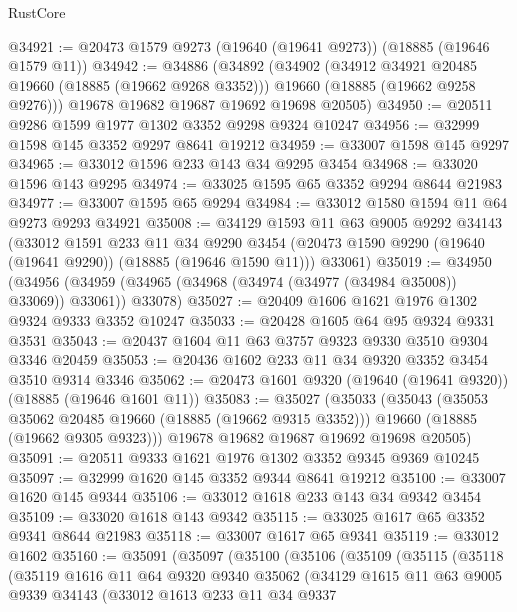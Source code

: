 \begin{lexlean}{RustCore}
\begin{coremodule}
@34921 := @20473 @1579 @9273 (@19640 (@19641 @9273)) (@18885 (@19646 @1579 @11))
@34942 := @34886
    (@34892
      (@34902
        (@34912 @34921 @20485 @19660 (@18885 (@19662 @9268 @3352)))
        @19660
        (@18885 (@19662 @9258 @9276)))
      @19678
      @19682
      @19687
      @19692
      @19698
      @20505)
@34950 := @20511 @9286 @1599 @1977 @1302 @3352 @9298 @9324 @10247
@34956 := @32999 @1598 @145 @3352 @9297 @8641 @19212
@34959 := @33007 @1598 @145 @9297
@34965 := @33012 @1596 @233 @143 @34 @9295 @3454
@34968 := @33020 @1596 @143 @9295
@34974 := @33025 @1595 @65 @3352 @9294 @8644 @21983
@34977 := @33007 @1595 @65 @9294
@34984 := @33012 @1580 @1594 @11 @64 @9273 @9293 @34921
@35008 := @34129
    @1593
    @11
    @63
    @9005
    @9292
    @34143
    (@33012
      @1591
      @233
      @11
      @34
      @9290
      @3454
      (@20473 @1590 @9290 (@19640 (@19641 @9290)) (@18885 (@19646 @1590 @11)))
      @33061)
@35019 := @34950
    (@34956 (@34959 (@34965 (@34968 (@34974 (@34977 (@34984 @35008)) @33069)) @33061)) @33078)
@35027 := @20409 @1606 @1621 @1976 @1302 @9324 @9333 @3352 @10247
@35033 := @20428 @1605 @64 @95 @9324 @9331 @3531
@35043 := @20437 @1604 @11 @63 @3757 @9323 @9330 @3510 @9304 @3346 @20459
@35053 := @20436 @1602 @233 @11 @34 @9320 @3352 @3454 @3510 @9314 @3346
@35062 := @20473 @1601 @9320 (@19640 (@19641 @9320)) (@18885 (@19646 @1601 @11))
@35083 := @35027
    (@35033
      (@35043
        (@35053 @35062 @20485 @19660 (@18885 (@19662 @9315 @3352)))
        @19660
        (@18885 (@19662 @9305 @9323)))
      @19678
      @19682
      @19687
      @19692
      @19698
      @20505)
@35091 := @20511 @9333 @1621 @1976 @1302 @3352 @9345 @9369 @10245
@35097 := @32999 @1620 @145 @3352 @9344 @8641 @19212
@35100 := @33007 @1620 @145 @9344
@35106 := @33012 @1618 @233 @143 @34 @9342 @3454
@35109 := @33020 @1618 @143 @9342
@35115 := @33025 @1617 @65 @3352 @9341 @8644 @21983
@35118 := @33007 @1617 @65 @9341
@35119 := @33012 @1602
@35160 := @35091
    (@35097
      (@35100
        (@35106
          (@35109
            (@35115
              (@35118
                (@35119
                  @1616
                  @11
                  @64
                  @9320
                  @9340
                  @35062
                  (@34129
                    @1615
                    @11
                    @63
                    @9005
                    @9339
                    @34143
                    (@33012
                      @1613
                      @233
                      @11
                      @34
                      @9337

\end{coremodule}
\end{lexlean}
